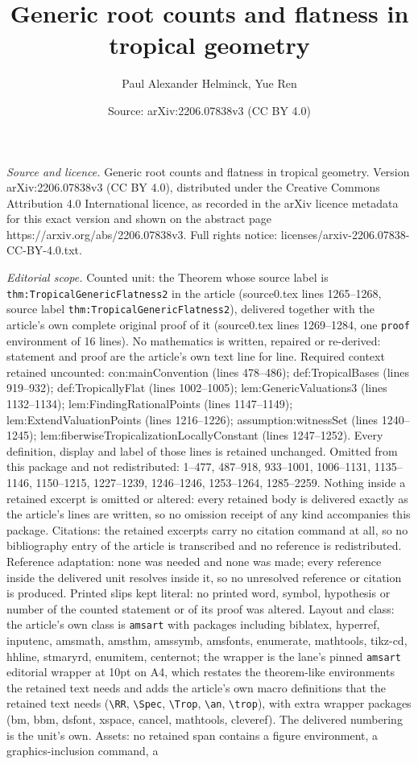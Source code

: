 \documentclass[10pt,a4paper]{amsart}
\title[Generic root counts and flatness in tropical geometry]{Generic root counts and flatness in tropical geometry}
\author{Paul Alexander Helminck, Yue Ren}
\date{Source: arXiv:2206.07838v3 (CC BY 4.0)}
\begin{document}
\maketitle

\noindent\emph{Source and licence.} Generic root counts and flatness in tropical geometry. Version arXiv:2206.07838v3 (CC BY 4.0), distributed under the Creative Commons Attribution 4.0 International licence, as recorded in the arXiv licence metadata for this exact version and shown on the abstract page https://arxiv.org/abs/2206.07838v3. Full rights notice: licenses/arxiv-2206.07838-CC-BY-4.0.txt.\par\smallskip

\noindent\textit{Editorial scope.} Counted unit: the Theorem whose source label is \texttt{thm:TropicalGenericFlatness2} in the article (source0.tex lines 1265--1268, source label \texttt{thm:TropicalGenericFlatness2}), delivered together with the article's own complete original proof of it (source0.tex lines 1269--1284, one \texttt{proof} environment of 16 lines). No mathematics is written, repaired or re-derived: statement and proof are the article's own text line for line. Required context retained uncounted: con:mainConvention (lines 478--486); def:TropicalBases (lines 919--932); def:TropicallyFlat (lines 1002--1005); lem:GenericValuations3 (lines 1132--1134); lem:FindingRationalPoints (lines 1147--1149); lem:ExtendValuationPoints (lines 1216--1226); assumption:witnessSet (lines 1240--1245); lem:fiberwiseTropicalizationLocallyConstant (lines 1247--1252). Every definition, display and label of those lines is retained unchanged. Omitted from this package and not redistributed: 1--477, 487--918, 933--1001, 1006--1131, 1135--1146, 1150--1215, 1227--1239, 1246--1246, 1253--1264, 1285--2259. Nothing inside a retained excerpt is omitted or altered: every retained body is delivered exactly as the article's lines are written, so no omission receipt of any kind accompanies this package. Citations: the retained excerpts carry no citation command at all, so no bibliography entry of the article is transcribed and no reference is redistributed. Reference adaptation: none was needed and none was made; every reference inside the delivered unit resolves inside it, so no unresolved reference or citation is produced. Printed slips kept literal: no printed word, symbol, hypothesis or number of the counted statement or of its proof was altered. Layout and class: the article's own class is \texttt{amsart} with packages including biblatex, hyperref, inputenc, amsmath, amsthm, amssymb, amsfonts, enumerate, mathtools, tikz-cd, hhline, stmaryrd, enumitem, centernot; the wrapper is the lane's pinned \texttt{amsart} editorial wrapper at 10pt on A4, which restates the theorem-like environments the retained text needs and adds the article's own macro definitions that the retained text needs (\texttt{\textbackslash RR}, \texttt{\textbackslash Spec}, \texttt{\textbackslash Trop}, \texttt{\textbackslash an}, \texttt{\textbackslash trop}), with extra wrapper packages (bm, bbm, dsfont, xspace, cancel, mathtools, cleveref). The delivered numbering is the unit's own. Assets: no retained span contains a figure environment, a graphics-inclusion command, a 
\end{document}
